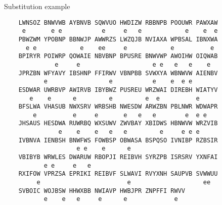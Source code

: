 \documentclass[8pt]{beamer}
\theoremstyle{plain}
\begin{document}
\begin{frame}[fragile]{Substitution example}
\begin{center}
\begin{BVerbatim}
    LWNSOZ BNWVWB AYBNVB SQWVUO HWDIZW RBBNPB POOUWR PAWXAW
     e       e e           e     e   e            e    e  e
    PBWZWM YPOBNP BBNWJP AWWRZS LWZQJB NVIAXA WPBSAL IBNXWA
      e e            e    ee     e            e          e 
    BPIRYR POIWRP QOWAIE NBVBNP BPUSRE BNWVWP AWOIHW OIQWAB
              e     e                    e e   e   e    e  
    JPRZBN WFYAVY IBSHNP FFIRWV VBNPBB SVWXYA WBNWVW AIENBV
           e                 e           e    e  e e       
    ESDWAR UWRBVP AWIRVB IBYBWZ PUSREU WRZWAI DIREBH WIATYV
       e    e      e         e         e  e          e     
    BFSLWA VHASUB NWXSRV WRBSHB NWESDW ARWZBN PBLNWR WDWAPR
        e          e     e       e   e   e        e  e e   
    JHSAUS HESDWA RUWRBQ WXSUWV ZWVBAY XBIDWS HBNWVW WRZVIB
               e    e    e   e   e         e     e e e     
    IVBNVA IENBSH BNWFWS FOWBSP OBWASA BSPQSO IVNIBP RZBSIR
                    e e    e      e                        
    VBIBYB WRWLES DWARUW RBOPJI REIBVH SYRZPB ISRSRV YXNFAI
           e e     e   e                                   
    RXIFOW VPRZSA EPRIKI REIBVF SLWAVI RVYXNH SAUPVB SVWWUU
         e                        e                    ee  
    SVBOIC WOJBSW HHWXBB NWIAVP HWBJPR ZNPFFI RWVV
           e    e   e     e      e             e  
\end{BVerbatim}
\end{center}
\end{frame}
\end{document}

